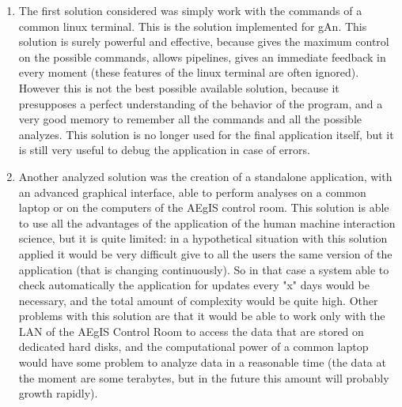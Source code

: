 \begin{enumerate}

\item 
The first solution considered was simply work with the commands of a common linux terminal. This is the solution implemented for gAn. This solution is surely powerful and effective, because gives the maximum control on the possible commands, allows pipelines, gives an immediate feedback in every moment (these features of the linux terminal are often ignored). However this is not the best possible available solution, because it presupposes a perfect understanding of the behavior of the program, and a very good memory to remember all the commands and all the possible analyzes. 
This solution is no longer used for the final application itself, but it is still very useful to debug the application in case of errors.   

\item
Another analyzed solution was the creation of a standalone application, with an advanced graphical interface, able to perform analyses on a common laptop or on the computers of the AEgIS control room. This solution is able to use all the advantages of the application of the human machine interaction science, but it is quite limited: in a hypothetical situation with this solution applied it would be very difficult give to all the users the same version of the application (that is changing continuously). So in that case a system able to check automatically the application for updates every "x" days would be necessary, and the total amount of complexity would be quite high. Other problems with this solution are that it would be able to work only with the LAN of the AEgIS Control Room to access the data that are stored on dedicated hard disks, and the computational power of a common laptop would have some problem to analyze data in a reasonable time (the data at the moment are some terabytes, but in the future this amount will probably growth rapidly).


\end{enumerate}
